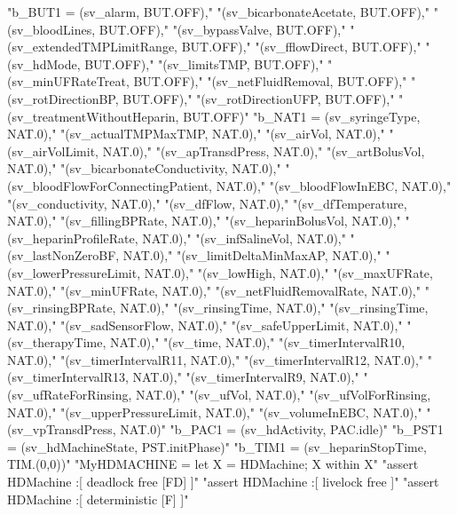 \begin{assert}
  "b_BUT1 = {(sv_alarm, BUT.OFF),"
  \also"(sv_bicarbonateAcetate, BUT.OFF),"
  \also"(sv_bloodLines, BUT.OFF),"
  \also"(sv_bypassValve, BUT.OFF),"
  \also"(sv_extendedTMPLimitRange, BUT.OFF),"
  \also"(sv_fflowDirect, BUT.OFF),"
  \also"(sv_hdMode, BUT.OFF),"
  \also"(sv_limitsTMP, BUT.OFF),"
  \also"(sv_minUFRateTreat, BUT.OFF),"
  \also"(sv_netFluidRemoval, BUT.OFF),"
  \also"(sv_rotDirectionBP, BUT.OFF),"
  \also"(sv_rotDirectionUFP, BUT.OFF),"
  \also"(sv_treatmentWithoutHeparin, BUT.OFF)}"
  \also"b_NAT1 = {(sv_syringeType, NAT.0),"
  \also"(sv_actualTMPMaxTMP, NAT.0),"
  \also"(sv_airVol, NAT.0),"
  \also"(sv_airVolLimit, NAT.0),"
  \also"(sv_apTransdPress, NAT.0),"
  \also"(sv_artBolusVol, NAT.0),"
  \also"(sv_bicarbonateConductivity, NAT.0),"
  \also"(sv_bloodFlowForConnectingPatient, NAT.0),"
  \also"(sv_bloodFlowInEBC, NAT.0),"
  \also"(sv_conductivity, NAT.0),"
  \also"(sv_dfFlow, NAT.0),"
  \also"(sv_dfTemperature, NAT.0),"
  \also"(sv_fillingBPRate, NAT.0),"
  \also"(sv_heparinBolusVol, NAT.0),"
  \also"(sv_heparinProfileRate, NAT.0),"
  \also"(sv_infSalineVol, NAT.0),"
  \also"(sv_lastNonZeroBF, NAT.0),"
  \also"(sv_limitDeltaMinMaxAP, NAT.0),"
  \also"(sv_lowerPressureLimit, NAT.0),"
  \also"(sv_lowHigh, NAT.0),"
  \also"(sv_maxUFRate, NAT.0),"
  \also"(sv_minUFRate, NAT.0),"
  \also"(sv_netFluidRemovalRate, NAT.0),"
  \also"(sv_rinsingBPRate, NAT.0),"
  \also"(sv_rinsingTime, NAT.0),"
  \also"(sv_rinsingTime, NAT.0),"
  \also"(sv_sadSensorFlow, NAT.0),"
  \also"(sv_safeUpperLimit, NAT.0),"
  \also"(sv_therapyTime, NAT.0),"
  \also"(sv_time, NAT.0),"
  \also"(sv_timerIntervalR10, NAT.0),"
  \also"(sv_timerIntervalR11, NAT.0),"
  \also"(sv_timerIntervalR12, NAT.0),"
  \also"(sv_timerIntervalR13, NAT.0),"
  \also"(sv_timerIntervalR9, NAT.0),"
  \also"(sv_ufRateForRinsing, NAT.0),"
  \also"(sv_ufVol, NAT.0),"
  \also"(sv_ufVolForRinsing, NAT.0),"
  \also"(sv_upperPressureLimit, NAT.0),"
  \also"(sv_volumeInEBC, NAT.0),"
  \also"(sv_vpTransdPress, NAT.0)}"
  \also"b_PAC1 = {(sv_hdActivity, PAC.{idle})}"
  \also"b_PST1 = {(sv_hdMachineState, PST.{initPhase})}"
  \also"b_TIM1 = {(sv_heparinStopTime, TIM.(0,0))}"
  \also "MyHDMACHINE = let X = HDMachine; X within X"
  \also "assert HDMachine :[ deadlock free [FD] ]"
  \also "assert HDMachine :[ livelock free ]"
  \also "assert HDMachine :[ deterministic [F] ]"
\end{assert}

